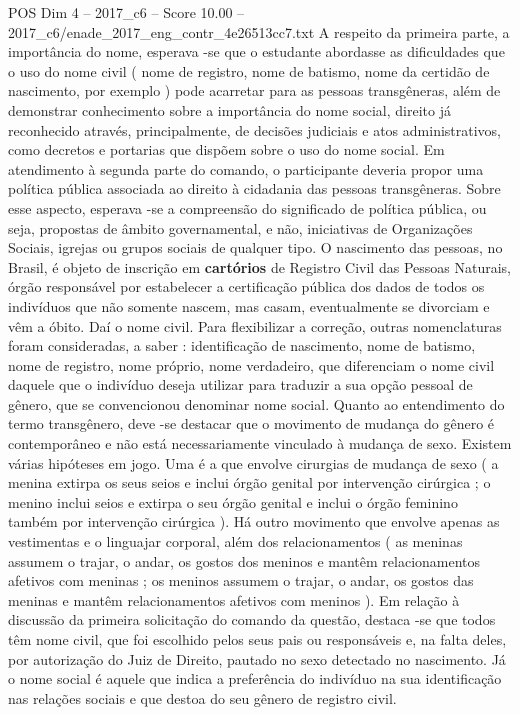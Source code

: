 \begin{textsample}{POS Dim 4 – 2017\_c6 – Score 10.00 – 2017\_c6/enade\_2017\_eng\_contr\_4e26513cc7.txt}
A respeito da primeira parte, a importância do nome, esperava -se que o estudante abordasse as dificuldades que o uso do nome civil ( nome de registro, nome de batismo, nome da certidão de nascimento, por exemplo ) pode acarretar para as pessoas transgêneras, além de demonstrar conhecimento sobre a importância do nome social, direito já reconhecido através, principalmente, de decisões judiciais e atos administrativos, como decretos e portarias que dispõem sobre o uso do nome social.
Em atendimento à segunda parte do comando, o participante deveria propor uma política pública associada ao direito à cidadania das pessoas transgêneras.
Sobre esse aspecto, esperava -se a compreensão do significado de política pública, ou seja, propostas de âmbito governamental, e não, iniciativas de Organizações Sociais, igrejas ou grupos sociais de qualquer tipo.
O nascimento das pessoas, no Brasil, é objeto de inscrição em \textbf{cartórios} de Registro Civil das Pessoas Naturais, órgão responsável por estabelecer a certificação pública dos dados de todos os indivíduos que não somente nascem, mas casam, eventualmente se divorciam e vêm a óbito.
Daí o nome civil.
Para flexibilizar a correção, outras nomenclaturas foram consideradas, a saber : identificação de nascimento, nome de batismo, nome de registro, nome próprio, nome verdadeiro, que diferenciam o nome civil daquele que o indivíduo deseja utilizar para traduzir a sua opção pessoal de gênero, que se convencionou denominar nome social.
Quanto ao entendimento do termo transgênero, deve -se destacar que o movimento de mudança do gênero é contemporâneo e não está necessariamente vinculado à mudança de sexo.
Existem várias hipóteses em jogo.
Uma é a que envolve cirurgias de mudança de sexo ( a menina extirpa os seus seios e inclui órgão genital por intervenção cirúrgica ; o menino inclui seios e extirpa o seu órgão genital e inclui o órgão feminino também por intervenção cirúrgica ).
Há outro movimento que envolve apenas as vestimentas e o linguajar corporal, além dos relacionamentos ( as meninas assumem o trajar, o andar, os gostos dos meninos e mantêm relacionamentos afetivos com meninas ; os meninos assumem o trajar, o andar, os gostos das meninas e mantêm relacionamentos afetivos com meninos ).
Em relação à discussão da primeira solicitação do comando da questão, destaca -se que todos têm nome civil, que foi escolhido pelos seus pais ou responsáveis e, na falta deles, por autorização do Juiz de Direito, pautado no sexo detectado no nascimento.
Já o nome social é aquele que indica a preferência do indivíduo na sua identificação nas relações sociais e que destoa do seu gênero de registro civil.

\end{textsample}
